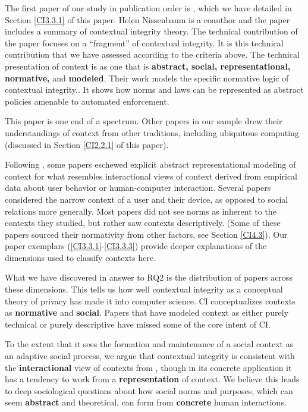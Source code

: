 \documentclass[../thesis.tex]{subfiles}
\begin{document}
The first paper of our study in publication order is \citet{barth06sp}, which we have detailed in Section \ref{CI3.3.1} of this paper. Helen
Nissenbaum is a coauthor and the paper includes a summary of contextual
integrity theory. The technical contribution of the paper focuses on a
``fragment'' of contextual
integrity. It is this technical contribution that we have assessed
according to the criteria above. The \citet{barth06sp} technical
presentation of context is as one that is \textbf{abstract, social,
representational, normative, }and\textbf{ modeled}. Their work models
the specific normative logic of contextual integrity.. It shows how
norms and laws can be represented as abstract policies amenable to
automated enforcement.

This paper is one end of a spectrum. Other papers in our sample drew
their understandings of context from other traditions, including
ubiquitous computing (discussed in Section \ref{CI2.2.1} of this paper).

Following \citet{dourish2004we}, some papers eschewed explicit abstract
representational modeling of context for what resembles interactional
views of context derived from empirical data about user behavior or
human-computer interaction. Several papers considered the narrow
context of a user and their device, as opposed to social relations more
generally. Most papers did not see norms as inherent to the contexts
they studied, but rather saw contexts descriptively. (Some of these
papers sourced their normativity from other factors, see Section \ref{CI4.3}).
Our paper exemplars (\ref{CI3.3.1}-\ref{CI3.3.3}) provide deeper explanations of the
dimensions used to classify contexts here.

What we have discovered in answer to RQ2 is the distribution of papers
across these dimensions. This tells us how well contextual integrity as
a conceptual theory of privacy has made it into computer science. CI
conceptualizes contexts as \textbf{normative} and \textbf{social}.
Papers that have modeled context as either purely technical or purely
descriptive have missed some of the core intent of CI.

To the extent that it sees the formation and maintenance of a social
context as an adaptive social process, we argue that contextual
integrity is consistent with the \textbf{interactional} view of
contexts from \citet{dourish2004we},
though in its concrete application it has
a tendency to work from a \textbf{representation} of context. We
believe this leads to deep sociological questions about how social
norms and purposes, which can seem \textbf{abstract} and theoretical,
can form from \textbf{concrete} human interactions. 
\end{document}
